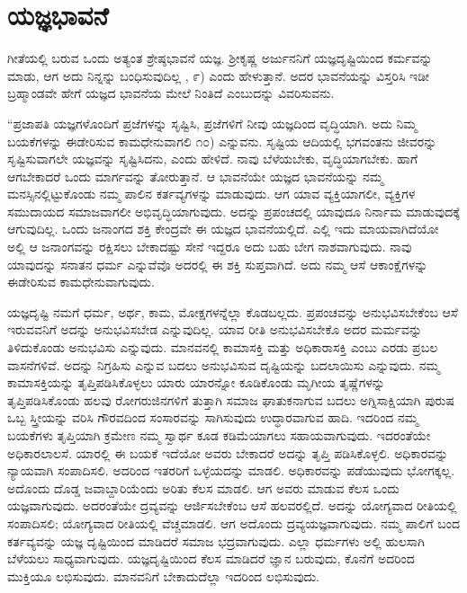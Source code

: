 \section*{ಯಜ್ಞಭಾವನೆ}

ಗೀತೆಯಲ್ಲಿ ಬರುವ ಒಂದು ಅತ್ಯಂತ ಶ್ರೇಷ್ಠಭಾವನೆ ಯಜ್ಞ. ಶ‍್ರೀಕೃಷ್ಣ ಅರ್ಜುನನಿಗೆ ಯಜ್ಞದೃಷ್ಟಿಯಿಂದ ಕರ್ಮವನ್ನು ಮಾಡು, ಆಗ ಅದು ನಿನ್ನನ್ನು ಬಂಧಿಸುವುದಿಲ್ಲ , ೯) ಎಂದು ಹೇಳುತ್ತಾನೆ. ಅದರ ಭಾವನೆಯನ್ನು ವಿಸ್ತರಿಸಿ ಇಡೀ ಬ್ರಹ್ಮಾಂಡವೇ ಹೇಗೆ ಯಜ್ಞದ ಭಾವನೆಯ ಮೇಲೆ ನಿಂತಿದೆ ಎಂಬುದನ್ನು ವಿವರಿಸುವನು.

“ಪ್ರಜಾಪತಿ ಯಜ್ಞಗಳೊಂದಿಗೆ ಪ್ರಜೆಗಳನ್ನು ಸೃಷ್ಟಿಸಿ, ಪ್ರಜೆಗಳಿಗೆ ನೀವು ಯಜ್ಞದಿಂದ ವೃದ್ಧಿಯಾಗಿ. ಅದು ನಿಮ್ಮ ಬಯಕೆಗಳನ್ನು ಈಡೇರಿಸುವ ಕಾಮಧೇನುವಾಗಲಿ ೧೦) ಎನ್ನುವನು. ಸೃಷ್ಟಿಯ ಆದಿಯಲ್ಲಿ ಭಗವಂತನು ಜೀವರನ್ನು ಸೃಷ್ಟಿಸುವಾಗಲೇ ಯಜ್ಞವನ್ನು ಸೃಷ್ಟಿಸಿದನು, ಎಂದು ಹೇಳಿದೆ. ನಾವು ಬೆಳೆಯಬೇಕು, ವೃದ್ಧಿಯಾಗಬೇಕು. ಹಾಗೆ ಆಗಬೇಕಾದರೆ ಒಂದು ಮಾರ್ಗವನ್ನು ತೋರುತ್ತಾನೆ. ಆ ಭಾವನೆಯೇ ಯಜ್ಞದ ಭಾವನೆಯನ್ನು ನಮ್ಮ ಮನಸ್ಸಿನಲ್ಲಿಟ್ಟುಕೊಂಡು ನಮ್ಮ ಪಾಲಿನ ಕರ್ತವ್ಯಗಳನ್ನು ಮಾಡುವುದು. ಆಗ ಯಾವ ವ್ಯಕ್ತಿಯಾಗಲೀ, ವ್ಯಕ್ತಿಗಳ ಸಮುದಾಯದ ಸಮಾಜವಾಗಲೀ ಅಭಿವೃದ್ಧಿಯಾಗುವುದು. ಅದನ್ನು ಪ್ರಪಂಚದಲ್ಲಿ ಯಾವುದೂ ನಿರ್ನಾಮ ಮಾಡುವುದಕ್ಕೆ ಆಗುವುದಿಲ್ಲ. ಒಂದು ಜನಾಂಗದ ಶಕ್ತಿ ಕೇಂದ್ರವೇ ಈ ಯಜ್ಞದ ಭಾವನೆಯಲ್ಲಿದೆ. ಎಲ್ಲಿ ಇದು ಮಾಯವಾಗಿದೆಯೋ ಅಲ್ಲಿ ಆ ಜನಾಂಗವನ್ನು ರಕ್ಷಿಸಲು ಬೇಕಾದಷ್ಟು ಸೇನೆ ಇದ್ದರೂ ಅದು ಬಹು ಬೇಗ ನಾಶವಾಗುವುದು. ನಾವು ಯಾವುದನ್ನು ಸನಾತನ ಧರ್ಮ ಎನ್ನುವೆವೊ ಅದರಲ್ಲಿ ಈ ಶಕ್ತಿ ಸುಪ್ತವಾಗಿದೆ. ಅದು ನಮ್ಮ ಆಸೆ ಆಕಾಂಕ್ಷೆಗಳನ್ನು ಈಡೇರಿಸುವ ಕಾಮಧೇನುವಾಗುವುದು.

ಯಜ್ಞದೃಷ್ಟಿ ನಮಗೆ ಧರ್ಮ, ಅರ್ಥ, ಕಾಮ, ಮೋಕ್ಷಗಳನ್ನೆಲ್ಲಾ ಕೊಡಬಲ್ಲದು. ಪ್ರಪಂಚವನ್ನು ಅನುಭವಿಸಬೇಕೆಂಬ ಆಸೆ ಇರುವವನಿಗೆ ಅದನ್ನು ಅನುಭವಿಸಬೇಡ ಎನ್ನುವುದಿಲ್ಲ. ಯಾವ ರೀತಿ ಅನುಭವಿಸಬೇಕೊ ಅದರ ಮರ್ಮವನ್ನು ತಿಳಿದುಕೊಂಡು ಅನುಭವಿಸು ಎನ್ನುವುದು. ಮಾನವನಲ್ಲಿ ಕಾಮಾಸಕ್ತಿ ಮತ್ತು ಅಧಿಕಾರಾಸಕ್ತಿ ಎಂಬು ಎರಡು ಪ್ರಬಲ ವಾಸನೆಗಳಿವೆ. ಅದನ್ನು ನಿಗ್ರಹಿಸು ಎನ್ನುವ ಬದಲು ಅನುಭವಿಸುವ ದೃಷ್ಟಿಯನ್ನು ಬದಲಾಯಿಸು ಎನ್ನುವುದು. ನಮ್ಮ ಕಾಮಾಸಕ್ತಿಯನ್ನು ತೃಪ್ತಿಪಡಿಸಿಕೊಳ್ಳಲು ಯಾರು ಯಾರನ್ನೋ ಕೂಡಿಕೊಂಡು ಮೃಗೀಯ ತೃಷ್ಣೆಗಳನ್ನು ತೃಪ್ತಿಪಡಿಸಿಕೊಂಡು ಹಲವು ರೋಗರುಜಿನಗಳಿಗೆ ತುತ್ತಾಗಿ ಸಮಾಜ ಘಾತುಕನಾಗುವ ಬದಲು ಅಗ್ನಿಸಾಕ್ಷಿಯಾಗಿ ಪುರುಷ ಒಬ್ಬ ಸ್ತ್ರೀಯನ್ನು ವರಿಸಿ ಗೌರವದಿಂದ ಸಂಸಾರವನ್ನು ಸಾಗಿಸುವುದು ಉದ್ಧಾರವಾಗುವ ಹಾದಿ. ಇದರಿಂದ ನಮ್ಮ ಬಯಕೆಗಳು ತೃಪ್ತಿಯಾಗಿ ಕ್ರಮೇಣ ನಮ್ಮ ಸ್ವಾರ್ಥ ಕೂಡ ಕಡಿಮೆಯಾಗಲು ಸಹಾಯವಾಗುವುದು. ಇದರಂತೆಯೇ ಅಧಿಕಾರಲಾಲಸೆ. ಯಾರಲ್ಲಿ ಈ ಬಯಕೆ ಇದೆಯೋ ಅವರು ಬೇಕಾದರೆ ಅದನ್ನು ತೃಪ್ತಿ ಪಡಿಸಿಕೊಳ್ಳಲಿ. ಅಧಿಕಾರವನ್ನು ನ್ಯಾಯವಾಗಿ ಸಂಪಾದಿಸಲಿ. ಅದರಿಂದ ಇತರರಿಗೆ ಒಳ್ಳೆಯದನ್ನು ಮಾಡಲಿ. ಅಧಿಕಾರವನ್ನು ಪಡೆಯುವುದು ಭೋಗಕ್ಕಲ್ಲ. ಅದೊಂದು ದೊಡ್ಡ ಜವಾಬ್ದಾರಿಯೆಂದು ಅರಿತು ಕೆಲಸ ಮಾಡಲಿ. ಆಗ ಅವರು ಮಾಡುವ ಕೆಲಸ ಒಂದು ಯಜ್ಞವಾಗುವುದು. ಅದರಂತೆಯೇ ದ್ರವ್ಯವನ್ನು ಆರ್ಜಿಸಬೇಕೆಂಬ ಆಸೆ ಹಲವರಲ್ಲಿದೆ. ಅದನ್ನು ಯೋಗ್ಯವಾದ ರೀತಿಯಲ್ಲಿ ಸಂಪಾದಿಸಲಿ; ಯೋಗ್ಯವಾದ ರೀತಿಯಲ್ಲಿ ವೆಚ್ಚಮಾಡಲಿ. ಆಗ ಅದೊಂದು ದ್ರವ್ಯಯಜ್ಞವಾಗುವುದು. ನಮ್ಮ ಪಾಲಿಗೆ ಬಂದ ಕರ್ತವ್ಯವನ್ನು ಯಜ್ಞ ದೃಷ್ಟಿಯಿಂದ ಮಾಡಿದರೆ ಸಮಾಜ ಭದ್ರವಾಗುವುದು. ಎಲ್ಲಾ ಧರ್ಮಗಳು ಅಲ್ಲಿ ಹುಲಸಾಗಿ ಬೆಳೆಯಲು ಸಾಧ್ಯವಾಗುವುದು. ಯಜ್ಞದೃಷ್ಟಿಯಿಂದ ಕೆಲಸ ಮಾಡಿದರೆ ಜ್ಞಾನ ಬರುವುದು, ಕೊನೆಗೆ ಅದರಿಂದ ಮುಕ್ತಿಯೂ ಲಭಿಸುವುದು. ಮಾನವನಿಗೆ ಬೇಕಾದುದೆಲ್ಲಾ ಇದರಿಂದ ಲಭಿಸುವುದು.

